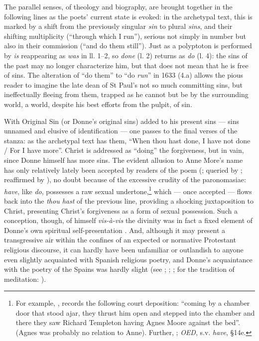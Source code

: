 \begin{paper}
The parallel senses, of theology and biography, are brought together in
the following lines as the poets' current state is evoked: in the
archetypal text, this is marked by a shift from the previously singular
\emph{sin} to plural \emph{sins}, and their shifting multiplicity
(``through which I run''), serious not simply in number but also in
their commission (``and do them still''). Just as a polyptoton is
performed by \emph{is} reappearing as \emph{was} in ll. 1--2, so
\emph{done} (l. 2) returns as \emph{do} (l. 4): the sins of the past may
no longer characterize him, but that does not mean that he is free of
sins. The alteration of ``do them'' to ``do \emph{run}'' in 1633 (4.a)
allows the pious reader to imagine the late dean of St Paul's not so
much committing sins, but ineffectually fleeing from them, trapped as he
cannot but be by the surrounding world, a world, despite his best
efforts from the pulpit, of sin.

With Original Sin (or Donne's original sins) added to his present sins
--- sins unnamed and elusive of identification --- one passes to the
final verses of the stanza: as the archetypal text has them, ``When thou
hast done, I have not done / For I have more''. Christ is addressed as
``doing'' the forgiveness, but in vain, since Donne himself has more
sins. The evident allusion to Anne More's name has only relatively
lately been accepted by readers of the poem (\citealt[90]{leigh_donnes_1978}; queried by \citealt[291--92]{novarr_amor_1987}; reaffirmed by \citealt[22]{ahl_ars_1988}), no doubt because of
the excessive crudity of the paronomasiae: \emph{have}, like \emph{do},
possesses a raw sexual undertone,\footnote{For example, \citealt[53]{quaife_wanton_1979},
  records the following court deposition: ``coming by a chamber door
  that stood ajar, they thrust him open and stepped into the chamber and
  there they saw Richard Templeton having Agnes Moore against the bed''.
  (Agnes was probably no relation to Anne). Further, \citealt[119]{patridge_shakespeares_1968};
  \emph{OED}, s.v. \emph{have}, §14e.} which --- once accepted --- flows
back into the \emph{thou hast} of the previous line, providing a
shocking juxtaposition to Christ, presenting Christ's forgiveness as a
form of sexual possession. Such a conception, though, of himself
\emph{vis-à-vis} the divinity was in fact a fixed element of Donne's own
spiritual self-presentation \citep{challis_conflicting_2016}. And, although it may present
a transgressive air within the confines of an expected or normative
Protestant religious discourse, it can hardly have been unfamiliar or
outlandish to anyone even slightly acquainted with Spanish religious
poetry, and Donne's acquaintance with the poetry of the Spains was
hardly slight (see \citealt[II.4]{grierson_poems_1912}; \citealt{thompson_mysticism_1921}; \citealt{cora_institution_1996}; for the tradition of meditation: \citealt{roston_donne_2005}).


\end{paper}
